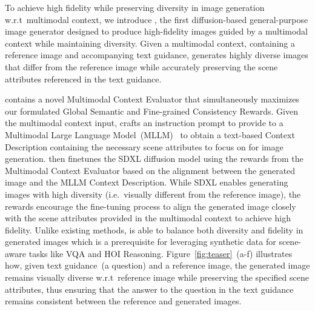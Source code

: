 
To achieve high fidelity while preserving diversity in image generation w.r.t~multimodal context, we introduce \method, the first diffusion-based general-purpose image generator designed to produce high-fidelity images guided by a multimodal context while maintaining diversity. Given a multimodal context, containing a reference image and accompanying text guidance, \method generates highly diverse images that differ from the reference image while accurately preserving the scene attributes referenced in the text guidance. 

 
\method contains a novel Multimodal Context Evaluator that simultaneously maximizes our formulated Global Semantic and Fine-grained Consistency Rewards. Given the multimodal context input, \method crafts an instruction prompt to provide to a Multimodal Large Language Model~(MLLM)~\citep{liu2024improved, chen2024internvl} to obtain a text-based Context Description containing the necessary scene attributes to focus on for image generation. \method then finetunes the SDXL diffusion model using the rewards from the Multimodal Context Evaluator based on the alignment between the generated image and the MLLM Context Description. While SDXL enables generating images with high diversity (i.e.~visually different from the reference image), the rewards encourage the fine-tuning process to align the generated image closely with the scene attributes provided in the multimodal context to achieve high fidelity. Unlike existing methods, \method is able to balance both diversity and fidelity in generated images which is a prerequisite for leveraging synthetic data for scene-aware tasks like VQA and HOI Reasoning. Figure~\ref{fig:teaser}~(a-f) illustrates how, given text guidance~(a question) and a reference image, the generated image remains visually diverse w.r.t~reference image while preserving the specified scene attributes, thus ensuring that the answer to the question in the text guidance remains consistent between the reference and generated images.
 
